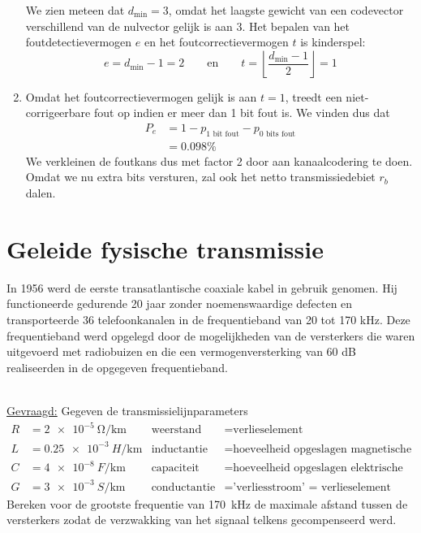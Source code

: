 \documentclass[kulak]{kulakarticle}
\begin{document}
\begin{enumerate}
		We zien meteen dat \(d_{\text{min}}=3\), omdat het laagste gewicht van een codevector verschillend van de nulvector gelijk is aan 3. Het bepalen van het foutdetectievermogen \(e\) en het foutcorrectievermogen \(t\) is kinderspel: \[e=d_{\text{min}}-1=\boxed{2} \qquad \text{en} \qquad t=\left\lfloor\frac{d_{\text{min}}-1}{2}\right\rfloor=\boxed{1}\]

		\item Omdat het foutcorrectievermogen gelijk is aan \(t=1\), treedt een niet-corrigeerbare fout op indien er meer dan 1 bit fout is. We vinden dus dat \begin{align*}
			P_e &= 1 - p_{\text{1 bit fout}} - p_{\text{0 bits fout}} \\
			&= \boxed{0.098\%}
		\end{align*}
		We verkleinen de foutkans dus met factor 2 door aan kanaalcodering te doen. Omdat we nu extra bits versturen, zal ook het netto transmissiedebiet \( r_b \) dalen.
	\end{enumerate}

	\newpage

	\section{Geleide fysische transmissie}

	In 1956 werd de eerste transatlantische coaxiale kabel in gebruik genomen. Hij functioneerde gedurende 20 jaar zonder noemenswaardige defecten en transporteerde 36 telefoonkanalen in de frequentieband van 20 tot 170 kHz. Deze frequentieband werd opgelegd door de mogelijkheden van de versterkers die waren uitgevoerd met radiobuizen en die een vermogenversterking van 60 dB realiseerden in de opgegeven frequentieband.

	\hfill \\
	\underline{Gevraagd:}
	Gegeven de transmissielijnparameters \begin{align*}
			R &= \SI{2e-5}{\ohm/\kilo\meter} &\text{weerstand}\ &= \text{verlieselement} \\
			L &= \SI{0.25e-3}{H/\kilo\meter} &\text{inductantie} &= \text{hoeveelheid opgeslagen magnetische energie} \\
			C &= \SI{4e-8}{F/\kilo\meter} &\text{capaciteit} &= \text{hoeveelheid opgeslagen elektrische energie} \\
			G &= \SI{3e-3}{S/\kilo\meter} &\text{conductantie} &= \text{'verliesstroom' = verlieselement}
		\end{align*} Bereken voor de grootste frequentie van \SI{170}{\kilo\hertz} de maximale afstand tussen de versterkers zodat de verzwakking van het signaal telkens gecompenseerd werd.
\end{document}
